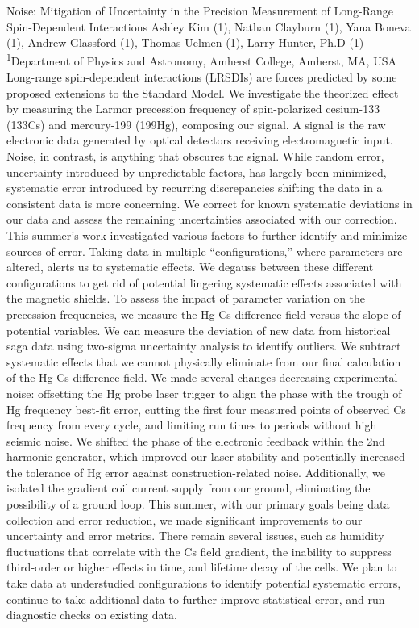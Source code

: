\makeabstract
{
Noise: Mitigation of Uncertainty in the Precision Measurement of Long-Range Spin-Dependent Interactions
}
{
Ashley Kim (1), Nathan Clayburn (1), Yana Boneva (1), Andrew Glassford (1), Thomas Uelmen (1), Larry Hunter, Ph.D (1)
}
{
\textsuperscript{1}Department of Physics and Astronomy, Amherst College, Amherst, MA, USA
}
{
Long-range spin-dependent interactions (LRSDIs) are forces predicted by some proposed extensions to the Standard Model. We investigate the theorized effect by measuring the Larmor precession frequency of spin-polarized cesium-133 (133Cs) and mercury-199 (199Hg), composing our signal. A signal is the raw electronic data generated by optical detectors receiving electromagnetic input. Noise, in contrast, is anything that obscures the signal. While random error, uncertainty introduced by unpredictable factors, has largely been minimized, systematic error introduced by recurring discrepancies shifting the data in a consistent data is more concerning. We correct for known systematic deviations in our data and assess the remaining uncertainties associated with our correction. This summer’s work investigated various factors to further identify and minimize sources of error.
}
{
Taking data in multiple “configurations,” where parameters are altered, alerts us to systematic effects. We degauss between these different configurations to get rid of potential lingering systematic effects associated with the magnetic shields. To assess the impact of parameter variation on the precession frequencies, we measure the Hg-Cs difference field versus the slope of potential variables. We can measure the deviation of new data from historical saga data using two-sigma uncertainty analysis to identify outliers. We subtract systematic effects that we cannot physically eliminate from our final calculation of the Hg-Cs difference field.
}
{
We made several changes decreasing experimental noise: offsetting the Hg probe laser trigger to align the phase with the trough of Hg frequency best-fit error, cutting the first four measured points of observed Cs frequency from every cycle, and limiting run times to periods without high seismic noise. We shifted the phase of the electronic feedback within the 2nd harmonic generator, which improved our laser stability and potentially increased the tolerance of Hg error against construction-related noise. Additionally, we isolated the gradient coil current supply from our ground, eliminating the possibility of a ground loop.
}
{
This summer, with our primary goals being data collection and error reduction, we made significant improvements to our uncertainty and error metrics. There remain several issues, such as humidity fluctuations that correlate with the Cs field gradient, the inability to suppress third-order or higher effects in time, and lifetime decay of the cells. We plan to take data at understudied configurations to identify potential systematic errors, continue to take additional data to further improve statistical error, and run diagnostic checks on existing data.
}

\newpage
